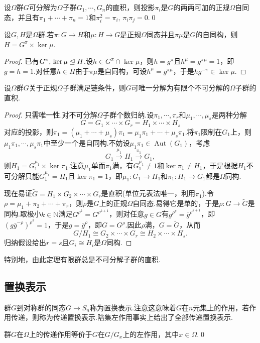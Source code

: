 \begin{lemma*}
	设$\Omega$群$G$可分解为$\Omega$子群$G_1,\cdots,G_n$的直积，则投影$\pi_i$是$G$的两两可加的正规$\Omega$自同态，并且有$\pi_1+\cdots+\pi_n=1$和$\pi_i^2=\pi_i,\,\pi_i\pi_j=0$.\qed
\end{lemma*}
\begin{lemma*}
	设$G,H$是$\Omega$群.若$\pi\colon G\to H$和$\mu\colon H\to G$是正规$\Omega$同态并且$\pi\mu$是$G$的自同构，则$H=G^\pi\times\ker\mu$.
\end{lemma*}
\begin{proof}
	已有$G^\pi,\,\ker\mu\trianglelefteq H$.设$h\in G^\pi\cap\ker\mu$，则$h=g^\pi$且$h^\mu=g^{\pi\mu}=1$，即$g=h=1$.对任意$h\in H$由于$\pi\mu$是自同构，可设$h^\mu=g^{\pi\mu}$，于是$hg^{-\pi}\in\ker\mu$.
\end{proof}
\begin{thm}
	设$\Omega$群$G$关于正规$\Omega$子群满足链条件，则$G$可唯一分解为有限个不可分解的$\Omega$子群的直积.
\end{thm}
\begin{proof}
	只需唯一性.对不可分解$\Omega$子群个数归纳.设$\pi_1,\cdots,\pi_r$和$\mu_1,\cdots,\mu_s$是两种分解
	\[
		G=G_1\times\cdots\times G_r=H_1\times\cdots\times H_s
	\]
	对应的投影，则$\pi_1=(\mu_1+\cdots+\mu_s)\pi_1=\mu_1\pi_1+\cdots+\mu_s\pi_1$.将$\pi_1$限制在$G_1$上，则$\mu_1\pi_1,\cdots,\mu_s\pi_1$中至少一个是自同构.不妨设$\mu_1\pi_1\in\operatorname*{Aut}(G_1)$，考虑
	\[
		G_1\overset{\mu_1}{\longrightarrow}H_1\overset{\pi_1}{\longrightarrow}G_1,
	\]
	则$H_1=G_1^{\mu_1}\times\ker\pi_1$.注意$\mu_1$单而$\pi_1$满，有$G_1^{\mu_1}\ne 1$和$\ker\pi_1\ne H_1$，于是根据$H_1$不可分解只能$G_1^{\mu_1}=H_1$且$\ker\pi_1=1$，即$\mu_1\colon G_1\to H_1$和$\pi_1\colon H_1\to G_1$都是$\Omega$同构.

	现在易证$\tilde{G}=H_1\times G_2\times\cdots\times G_r$是直积(单位元表法唯一，利用$\pi_1$).令$\rho=\mu_1+\pi_2+\cdots+\pi_r$，则$\rho$是$G$上的正规$\Omega$自同态.易得它是单的，于是$\rho\colon G\to\tilde{G}$是同构.取极小$k\in\mathbb{N}$满足$G^{\rho^k}=G^{\rho^{k+1}}$，则对任意$g\in G$有$g^{\rho^k}=\bar g^{\rho^{k+1}}$，即$(g\bar g^{-\rho})^{\rho^k}=1$，于是$g=\bar g^\rho$，即$G=G^\rho$.因此$\rho$满，$G=\tilde{G}$，从而
	\[
		G/H_1\cong G_2\times\cdots\times G_r\cong H_2\times\cdots\times H_s.
	\]
	归纳假设给出$r=s$且$G_i\cong H_i$是$\Omega$同构.
\end{proof}

特别地，由此定理有限群总是不可分解子群的直积.

\subsection{置换表示}\label{subsec:PermutationRepresentation}
群$G$到对称群的同态$G\to S_n$称为置换表示.注意这意味着$G$在$n$元集上的作用，若作用传递，则称为{\heiti 传递置换表示}.陪集左作用事实上给出了全部传递置换表示.
\begin{lemma}
	群$G$在$\Omega$上的传递作用等价于$G$在$G/G_x$上的左作用，其中$x\in\Omega$.\qed
\end{lemma}

